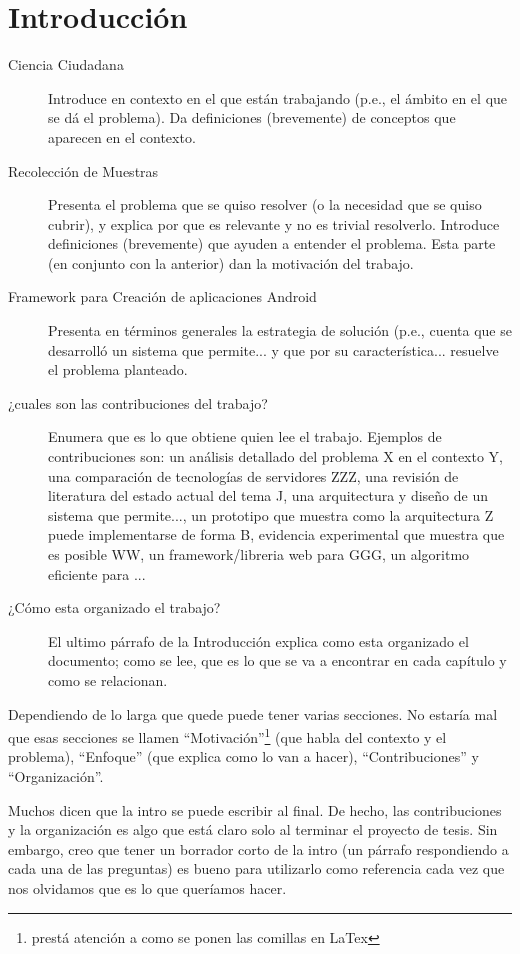 \chapter{Introducción}

\label{introduccion}

\begin{description}
\item[ Ciencia  Ciudadana ] Introduce en contexto en el que están trabajando (p.e., el ámbito en el que se dá el problema). Da definiciones (brevemente) de conceptos que aparecen en el contexto. 
\item[ Recolección de Muestras ] Presenta el problema que se quiso resolver (o la necesidad que se quiso cubrir), y explica por que es relevante y no es trivial resolverlo.  Introduce definiciones (brevemente) que ayuden a entender el problema. Esta parte (en conjunto con la anterior) dan la motivación del trabajo. 
\item[ Framework para Creación de aplicaciones Android] Presenta en términos generales la estrategia de solución (p.e., cuenta que se desarrolló un sistema que permite... y que por su característica... resuelve el problema planteado.
\item[¿cuales son las contribuciones del trabajo? ] Enumera que es lo que obtiene quien lee el trabajo. Ejemplos de contribuciones son: un análisis detallado del problema X en el contexto Y, una comparación de tecnologías de servidores ZZZ, una revisión de literatura del estado actual del tema J, una arquitectura y diseño de un sistema que permite..., un prototipo que muestra como la arquitectura Z puede implementarse de forma B, evidencia experimental que muestra que es posible WW, un framework/libreria web para GGG, un algoritmo eficiente para ...   
\item[¿Cómo esta organizado el trabajo?] El ultimo párrafo de la Introducción explica como esta organizado el documento; como se lee, que es lo que se va a encontrar en cada capítulo y como se relacionan.   
\end{description}

Dependiendo de lo larga que quede puede tener varias secciones. No estaría mal que esas secciones se llamen ``Motivación''\footnote{prestá atención a como se ponen las comillas en LaTex} (que habla del contexto y el problema), ``Enfoque'' (que explica como lo van a hacer), ``Contribuciones'' y ``Organización''.  

Muchos dicen que la intro se puede escribir al final. De hecho, las contribuciones y la organización es algo que está claro solo al terminar el proyecto de tesis. Sin embargo, creo que tener un borrador corto de la intro (un párrafo respondiendo a cada una de las preguntas) es bueno para utilizarlo como referencia cada vez que nos olvidamos que es lo que queríamos hacer. 


